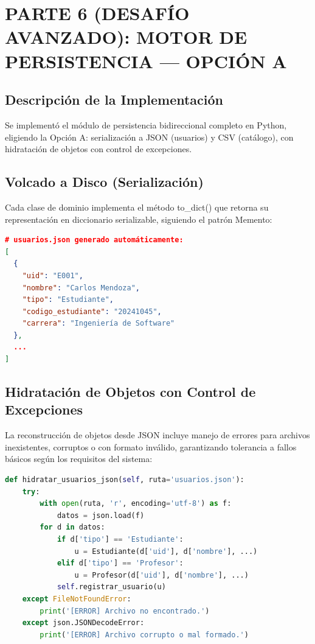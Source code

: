 \documentclass[12pt,a4paper]{article}
\begin{document}
\section{PARTE 6 (DESAFÍO AVANZADO): MOTOR DE PERSISTENCIA — OPCIÓN A}

\subsection{Descripción de la Implementación}
Se implementó el módulo de persistencia bidireccional completo en Python, eligiendo la Opción A: serialización a JSON (usuarios) y CSV (catálogo), con hidratación de objetos con control de excepciones.

\subsection{Volcado a Disco (Serialización)}
Cada clase de dominio implementa el método to\_dict() que retorna su representación en diccionario serializable, siguiendo el patrón Memento:

\begin{lstlisting}[language=json]
# usuarios.json generado automáticamente:
[
  {
    "uid": "E001",
    "nombre": "Carlos Mendoza",
    "tipo": "Estudiante",
    "codigo_estudiante": "20241045",
    "carrera": "Ingeniería de Software"
  },
  ...
]
\end{lstlisting}

\subsection{Hidratación de Objetos con Control de Excepciones}
La reconstrucción de objetos desde JSON incluye manejo de errores para archivos inexistentes, corruptos o con formato inválido, garantizando tolerancia a fallos básicos según los requisitos del sistema:

\begin{lstlisting}[language=Python]
def hidratar_usuarios_json(self, ruta='usuarios.json'):
    try:
        with open(ruta, 'r', encoding='utf-8') as f:
            datos = json.load(f)
        for d in datos:
            if d['tipo'] == 'Estudiante':
                u = Estudiante(d['uid'], d['nombre'], ...)
            elif d['tipo'] == 'Profesor':
                u = Profesor(d['uid'], d['nombre'], ...)
            self.registrar_usuario(u)
    except FileNotFoundError:
        print('[ERROR] Archivo no encontrado.')
    except json.JSONDecodeError:
        print('[ERROR] Archivo corrupto o mal formado.')
\end{lstlisting}
\end{document}
